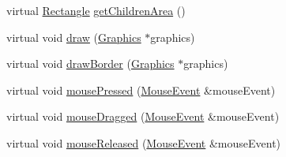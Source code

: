 \begin{DoxyCompactItemize}
\item 
virtual \hyperlink{classgcn_1_1Rectangle}{Rectangle} \hyperlink{classgcn_1_1Window_ae7022b52bb53543ff3cd366c124e15ff}{get\+Children\+Area} ()
\item 
virtual void \hyperlink{classgcn_1_1Window_a6d41ec33f8d4389510a9071067c919e5}{draw} (\hyperlink{classgcn_1_1Graphics}{Graphics} $\ast$graphics)
\item 
virtual void \hyperlink{classgcn_1_1Window_ae5564549656568a7932811e0f4025113}{draw\+Border} (\hyperlink{classgcn_1_1Graphics}{Graphics} $\ast$graphics)
\item 
virtual void \hyperlink{classgcn_1_1Window_a69fabb14f33237f03277b27f780e2725}{mouse\+Pressed} (\hyperlink{classgcn_1_1MouseEvent}{Mouse\+Event} \&mouse\+Event)
\item 
virtual void \hyperlink{classgcn_1_1Window_a72af9be129bb0e34dabf2f1023a289a3}{mouse\+Dragged} (\hyperlink{classgcn_1_1MouseEvent}{Mouse\+Event} \&mouse\+Event)
\item 
virtual void \hyperlink{classgcn_1_1Window_acbdf0ebf4a103fde65e17084ef44a9ba}{mouse\+Released} (\hyperlink{classgcn_1_1MouseEvent}{Mouse\+Event} \&mouse\+Event)
\end{DoxyCompactItemize}
